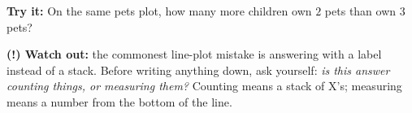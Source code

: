 \documentclass[12pt]{article}
\begin{document}
\begin{tryitbox}
\textbf{Try it:} \quad On the same pets plot, how many more children own $2$ pets than own
$3$ pets?\\[2pt]
\end{tryitbox}

\begin{watchoutbox}
\textbf{(!) Watch out:} the commonest line-plot mistake is answering with a label instead of
a stack. Before writing anything down, ask yourself: \emph{is this answer counting things, or
measuring them?} Counting means a stack of \textsf{X}'s; measuring means a number from the
bottom of the line.
\end{watchoutbox}
\end{document}

